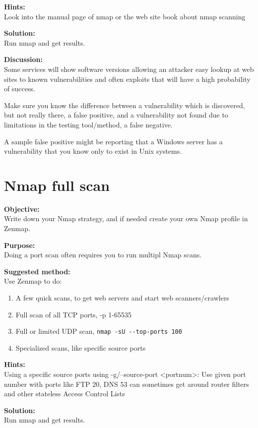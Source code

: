 \documentclass[a4paper,11pt,notitlepage]{report}
\begin{document}
{\bf Hints:} \\
Look into the manual page of nmap or the web site book about nmap scanning

{\bf Solution:}\\
Run nmap and get results.

{\bf Discussion:}\\

Some services will show software versions allowing an attacker easy lookup at web sites to known vulnerabilities and often exploits that will have a high probability of success.

Make sure you know the difference between a vulnerability which is discovered, but not really there, a false positive, and a vulnerability not found due to limitations in the testing tool/method, a false negative.

A sample false positive might be reporting that a Windows server has a vulnerability that you know only to exist in Unix systems.


\chapter{Nmap full scan}
\label{ex:nmap-strategy}


{\bf Objective:} \\
Write down your Nmap strategy, and if needed create your own Nmap profile in Zenmap.


{\bf Purpose:}\\
Doing a port scan often requires you to run multipl Nmap scans.


{\bf Suggested method:}\\
Use Zenmap to do:
\begin{enumerate}
\item A few quick scans, to get web servers and start web scanners/crawlers
\item Full scan of all TCP ports, -p 1-65535
\item Full or limited UDP scan, \verb+nmap -sU --top-ports 100+
\item Specialized scans, like specific source ports
\end{enumerate}


{\bf Hints:} \\
Using a specific source ports using -g/--source-port <portnum>: Use given port number with ports like FTP 20, DNS 53 can sometimes get around router filters and other stateless Access Control Lists

{\bf Solution:}\\
Run nmap and get results.
\end{document}
